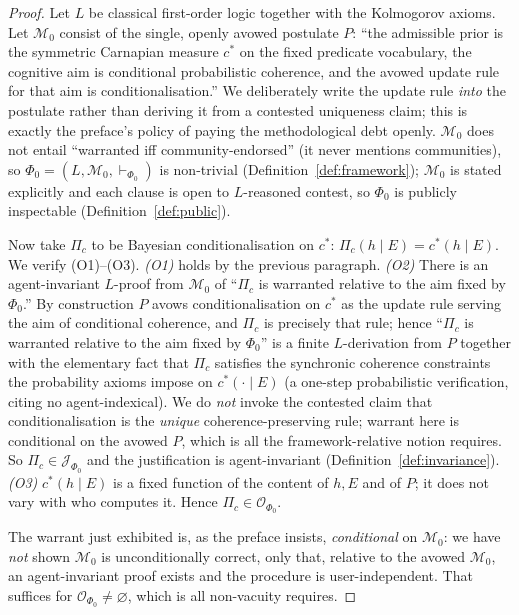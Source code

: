 \documentclass{amsart}
\theoremstyle{definition}
\theoremstyle{plain}
\theoremstyle{remark}
\begin{document}
\begin{proof}
Let $L$ be classical first-order logic together with the Kolmogorov axioms.
Let $\mathcal{M}_0$ consist of the single, openly avowed postulate $P$: ``the
admissible prior is the symmetric Carnapian measure $c^\ast$ on the fixed
predicate vocabulary, the cognitive aim is conditional probabilistic coherence,
and the avowed update rule for that aim is conditionalisation.'' We deliberately
write the update rule \emph{into} the postulate rather than deriving it from a
contested uniqueness claim; this is exactly the preface's policy of paying the
methodological debt openly. $\mathcal{M}_0$ does not entail ``warranted iff community-endorsed''
(it never mentions communities), so $\Phi_0=(L,\mathcal{M}_0,\vdash_{\Phi_0})$
is non-trivial (Definition~\ref{def:framework}); $\mathcal{M}_0$ is stated
explicitly and each clause is open to $L$-reasoned contest, so $\Phi_0$ is
publicly inspectable (Definition~\ref{def:public}).

Now take $\Pi_c$ to be Bayesian conditionalisation on $c^\ast$:
$\Pi_c(h\mid E)=c^\ast(h\mid E)$. We verify (O1)--(O3).
\emph{(O1)} holds by the previous paragraph.
\emph{(O2)} There is an agent-invariant $L$-proof from $\mathcal{M}_0$ of
``$\Pi_c$ is warranted relative to the aim fixed by $\Phi_0$.'' By construction
$P$ avows conditionalisation on $c^\ast$ as the update rule serving the aim of
conditional coherence, and $\Pi_c$ is precisely that rule; hence
``$\Pi_c$ is warranted relative to the aim fixed by $\Phi_0$'' is a finite
$L$-derivation from $P$ together with the elementary fact that $\Pi_c$ satisfies
the synchronic coherence constraints the probability axioms impose on
$c^\ast(\cdot\mid E)$ (a one-step probabilistic verification, citing no
agent-indexical). We do \emph{not} invoke the contested claim that
conditionalisation is the \emph{unique} coherence-preserving rule; warrant here
is conditional on the avowed $P$, which is all the framework-relative notion
requires. So $\Pi_c\in\mathcal{J}_{\Phi_0}$ and the justification is
agent-invariant (Definition~\ref{def:invariance}).
\emph{(O3)} $c^\ast(h\mid E)$ is a fixed function of the content of $h,E$ and of
$P$; it does not vary with who computes it. Hence
$\Pi_c\in\mathcal{O}_{\Phi_0}$.

The warrant just exhibited is, as the preface insists, \emph{conditional} on
$\mathcal{M}_0$: we have \emph{not} shown $\mathcal{M}_0$ is unconditionally
correct, only that, relative to the avowed $\mathcal{M}_0$, an agent-invariant
proof exists and the procedure is user-independent. That suffices for
$\mathcal{O}_{\Phi_0}\neq\varnothing$, which is all non-vacuity requires.
\end{proof}
\end{document}
